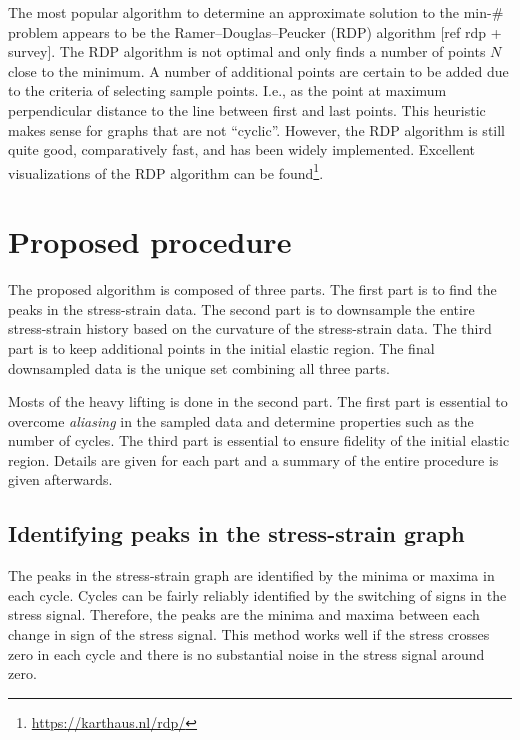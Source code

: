 \documentclass[a4paper,11pt]{article}
\begin{document}
The most popular algorithm to determine an approximate solution to the min-\# problem appears to be the Ramer–Douglas–Peucker (RDP) algorithm [ref rdp + survey].
The RDP algorithm is not optimal and only finds a number of points $N$ close to the minimum.
A number of additional points are certain to be added due to the criteria of selecting sample points.
I.e., as the point at maximum perpendicular distance to the line between first and last points.
This heuristic makes sense for graphs that are not ``cyclic''.
However, the RDP algorithm is still quite good, comparatively fast, and has been widely implemented.
Excellent visualizations of the RDP algorithm can be found\footnote{\url{https://karthaus.nl/rdp/}}.

\section{Proposed procedure}

The proposed algorithm is composed of three parts.
The first part is to find the peaks in the stress-strain data.
The second part is to downsample the entire stress-strain history based on the curvature of the stress-strain data.
The third part is to keep additional points in the initial elastic region.
The final downsampled data is the unique set combining all three parts.

Mosts of the heavy lifting is done in the second part.
The first part is essential to overcome \emph{aliasing} in the sampled data and determine properties such as the number of cycles.
The third part is essential to ensure fidelity of the initial elastic region.
Details are given for each part and a summary of the entire procedure is given afterwards.



\subsection{Identifying peaks in the stress-strain graph}

The peaks in the stress-strain graph are identified by the minima or maxima in each cycle.
Cycles can be fairly reliably identified by the switching of signs in the stress signal.
Therefore, the peaks are the minima and maxima between each change in sign of the stress signal.
This method works well if the stress crosses zero in each cycle and there is no substantial noise in the stress signal around zero.
\end{document}
